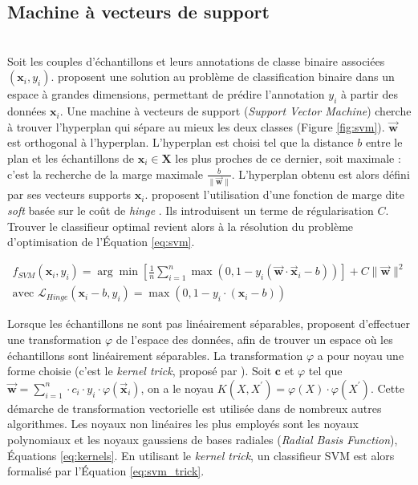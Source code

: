 \subsection{Machine à vecteurs de support}\mbox{\label{parag:svm}} \\
Soit les couples d'échantillons et leurs annotations de classe binaire associées $(\mathbf{x}_i, y_i)$.
\citeauthor{vapnik_patterns_1963} \cite{vapnik_patterns_1963} proposent une solution au problème de classification binaire dans un espace à grandes dimensions, permettant de prédire l'annotation $y_i$ à partir des données $\mathbf{x}_i$.
Une machine à vecteurs de support (\textit{Support Vector Machine}) cherche à trouver l'hyperplan qui sépare au mieux les deux classes (Figure \ref{fig:svm}). $\vec{\mathbf{w}}$  est orthogonal à l'hyperplan.
L'hyperplan est choisi tel que la distance $b$ entre le plan et les échantillons de $\mathbf{x}_i \in \mathbf{X}$ les plus proches de ce dernier, soit maximale : c'est la recherche de la marge maximale $\frac{b}{\|\vec{\mathbf{w}}\|}$.
L'hyperplan obtenu est alors défini par ses vecteurs supports $\mathbf{x}_i$.
\citeauthor{cortes_supportvector_1995} proposent l'utilisation d'une fonction de marge dite \textit{soft} basée sur le coût de \textit{hinge} \cite{cortes_supportvector_1995, vapnik_support_1997}.
Ils introduisent un terme de régularisation $C$. Trouver le classifieur optimal revient alors à la résolution du problème d'optimisation de l'Équation \ref{eq:svm}.

\begin{equation} \label{eq:svm}
\begin{split}
f_{SVM}(\mathbf{x}_i, y_i) = \arg \min \left[\frac{1}{n} \sum_{i=1}^{n} \max \left(0, 1-y_{i}\left(\vec{\mathbf{w}} \cdot \vec{\mathbf{x}}_{i}-b\right)\right)\right]+ C \|\vec{\mathbf{w}}\|^{2}
\\
\text{avec } \mathcal{L}_{Hinge}(\mathbf{x}_i-b, y_i) = \max (0, 1 - y_i \cdot (\mathbf{x}_i-b))
\end{split}
\end{equation}

Lorsque les échantillons ne sont pas linéairement séparables, \citeauthor{boser_training_1992} \cite{boser_training_1992} proposent d'effectuer une transformation $\varphi$ de l'espace des données, afin de trouver un espace où les échantillons sont linéairement séparables.
La transformation $\varphi$ a pour noyau une forme choisie (c'est le \textit{kernel trick}, proposé par \citeauthor{aizerman_theoretical_1964} \cite{aizerman_theoretical_1964}).
Soit $\mathbf{c}$ et $\varphi$ tel que $\vec{\mathbf{w}}=\sum_{i=1}^{n} \cdot c_{i} \cdot y_{i} \cdot \varphi\left(\vec{\mathbf{x}}_{i}\right)$, on a le noyau $K\left(X, X^{\prime}\right) = \varphi \left(X\right) \cdot \varphi\left(X^{\prime}\right)$.
Cette démarche de transformation vectorielle est utilisée dans de nombreux autres algorithmes.
Les noyaux non linéaires les plus employés sont les noyaux polynomiaux et les noyaux gaussiens de bases radiales (\textit{Radial Basis Function}), Équations \ref{eq:kernels}.
En utilisant le \textit{kernel trick}, un classifieur SVM est alors formalisé par l'Équation \ref{eq:svm_trick}.


